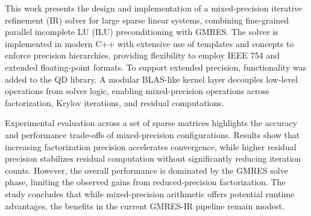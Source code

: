 
This work presents the design and implementation of a mixed-precision iterative
refinement (IR) solver for large sparse linear systems, combining fine-grained
parallel incomplete LU (ILU) preconditioning with GMRES. The solver is
implemented in modern C++ with extensive use of templates and concepts to
enforce precision hierarchies, providing flexibility to employ IEEE 754 and
extended floating-point formats. To support extended precision, functionality
was added to the QD library. A modular BLAS-like kernel layer decouples
low-level operations from solver logic, enabling mixed-precision operations
across factorization, Krylov iterations, and residual computations.

Experimental evaluation across a set of sparse matrices highlights the accuracy
and performance trade-offs of mixed-precision configurations. Results show that
increasing factorization precision accelerates convergence, while higher
residual precision stabilizes residual computation without significantly
reducing iteration counts. However, the overall performance is dominated by the
GMRES solve phase, limiting the observed gains from reduced-precision
factorization. The study concludes that while mixed-precision arithmetic offers
potential runtime advantages, the benefits in the current GMRES-IR pipeline
remain modest.
